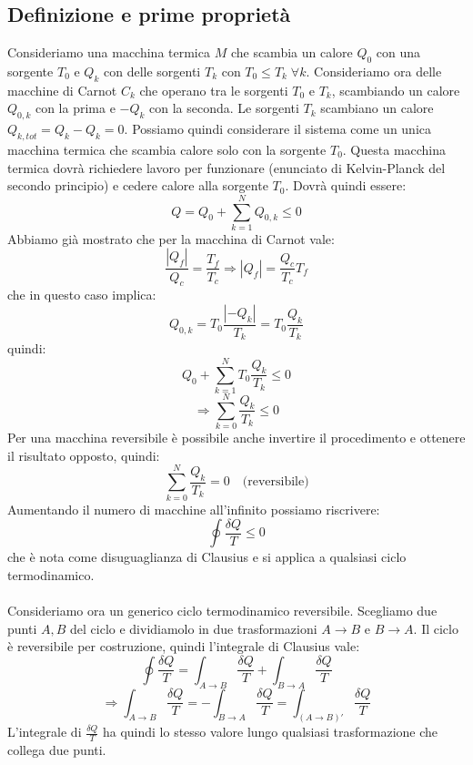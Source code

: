 \documentclass{article}
\begin{document}
\subsection{Definizione e prime proprietà}
Consideriamo una macchina termica $M$ che scambia un calore $Q_0$ con una sorgente $T_0$ e $Q_k$ con delle sorgenti $T_k$ con $T_0\leq T_k\;\forall k$. Consideriamo ora delle macchine di Carnot $C_k$ che operano tra le sorgenti $T_0$ e $T_k$, scambiando un calore $Q_{0,k}$ con la prima e $-Q_k$ con la seconda. Le sorgenti $T_k$ scambiano un calore $Q_{k,tot}=Q_k-Q_k=0$. Possiamo quindi considerare il sistema come un unica macchina termica che scambia calore solo con la sorgente $T_0$. Questa macchina termica dovrà richiedere lavoro per funzionare (enunciato di Kelvin-Planck del secondo principio) e cedere calore alla sorgente $T_0$. Dovrà quindi essere:
$$ Q=Q_0+\sum_{k=1}^{N}Q_{0,k}\leq0 $$
Abbiamo già mostrato che per la macchina di Carnot vale:
$$ \frac{|Q_f|}{Q_c} = \frac{T_f}{T_c} \Rightarrow |Q_f| = \frac{Q_c}{T_c}T_f $$
che in questo caso implica:
$$ Q_{0,k}=T_0\frac{|-Q_k|}{T_k}=T_0\frac{Q_k}{T_k} $$
quindi:
$$ Q_0+\sum_{k=1}^{N}T_0\frac{Q_k}{T_k}\leq0$$
$$ \Rightarrow\sum_{k=0}^{N}\frac{Q_k}{T_k}\leq0 $$
Per una macchina reversibile è possibile anche invertire il procedimento e ottenere il risultato opposto, quindi:
$$ \sum_{k=0}^{N}\frac{Q_k}{T_k}=0\quad\text{(reversibile)} $$
Aumentando il numero di macchine all'infinito possiamo riscrivere:
$$ \oint\frac{\delta Q}{T}\leq 0 $$
che è nota come disuguaglianza di Clausius e si applica a qualsiasi ciclo termodinamico.\\\\
Consideriamo ora un generico ciclo termodinamico reversibile. Scegliamo due punti $A,B$ del ciclo e dividiamolo in due trasformazioni $A\rightarrow B$ e $B\rightarrow A$. Il ciclo è reversibile per costruzione, quindi l'integrale di Clausius vale:
$$ \oint\frac{\delta Q}{T} = \int_{A\rightarrow B}\frac{\delta Q}{T}+\int_{B\rightarrow A}\frac{\delta Q}{T} $$
$$ \Rightarrow \int_{A\rightarrow B}\frac{\delta Q}{T} = -\int_{B\rightarrow A}\frac{\delta Q}{T} = \int_{(A\rightarrow B)'}\frac{\delta Q}{T}$$
L'integrale di $\frac{\delta Q}{T}$ ha quindi lo stesso valore lungo qualsiasi trasformazione che collega due punti.










\Index
\end{document}

